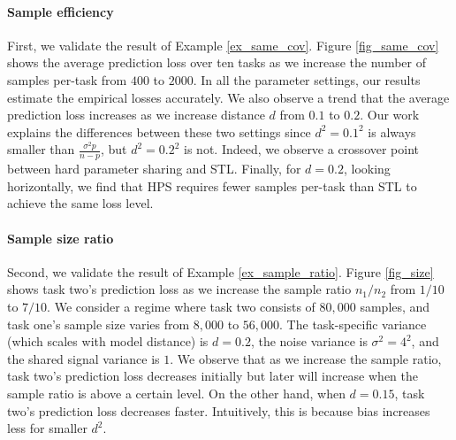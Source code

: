 {\paragraph{Sample efficiency}
First, we validate the result of Example \ref{ex_same_cov}.
Figure \ref{fig_same_cov} shows the average prediction loss over ten tasks as we increase the number of samples per-task from $400$ to $2000$.
In all the parameter settings, our results estimate the empirical losses accurately.
We also observe a trend that the average prediction loss increases as we increase distance $d$ from $0.1$ to $0.2$.
Our work explains the differences between these two settings since $d^2 = 0.1^2$ is always smaller than $\frac{\sigma^2 p}{n - p}$, but $d^2 = 0.2^2$ is not.
Indeed, we observe a crossover point between hard parameter sharing and STL.
Finally, for $d = 0.2$, looking horizontally, we find that HPS requires fewer samples per-task than STL to achieve the same loss level. %

\paragraph{Sample size ratio}
Second, we validate the result of Example \ref{ex_sample_ratio}.
Figure \ref{fig_size} shows task two's prediction loss  as we increase the sample ratio $n_1 / n_2$ from $1/10$ to $7/10$.
We consider a regime where task two consists of $80,000$ samples, and task one's sample size varies from $8,000$ to $56,000$.
The task-specific variance (which scales with model distance) is $d = 0.2$, the noise variance is $\sigma^2 = 4^2$, and the shared signal variance is $1$. We observe that as we increase the sample ratio, task two's prediction loss decreases initially but later will increase when the sample ratio is above a certain level.
On the other hand, when $d = 0.15$, task two's prediction loss decreases faster.
Intuitively, this is because bias increases less for smaller $d^2$.

}
